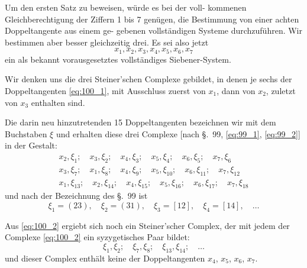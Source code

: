 \documentclass[12pt,a4paper]{article}
\theoremstyle{plain}
\theoremstyle{definition}
\theoremstyle{remark}
\begin{document}
Um den ersten Satz zu beweisen, würde es bei der voll-
kommenen Gleichberechtigung der Ziffern 1 bis 7 genügen, die
Bestimmung von einer achten Doppeltangente aus einem ge-
gebenen vollständigen Systeme durchzuführen. Wir bestimmen
aber besser gleichzeitig drei. Es sei also jetzt
\begin{equation}\label{eq:100_1}
x_1, x_2, x_3, x_4, x_5, x_6, x_7
\end{equation}
ein als bekannt vorausgesetztes vollständiges Siebener-System.

Wir denken uns die drei Steiner'schen Complexe gebildet, in
denen je sechs der Doppeltangenten \eqref{eq:100_1}, mit Ausschluss zuerst
von $x_1$, dann von $x_2$, zuletzt von $x_3$ enthalten sind.

Die darin neu hinzutretenden 15 Doppeltangenten bezeichnen
wir mit dem Buchstaben $\xi$ und erhalten diese drei Complexe
[nach \S.~99, \eqref{eq:99_1}, \eqref{eq:99_2}] in der Gestalt:
\begin{equation}\label{eq:100_2}
\begin{aligned}
x_2, \xi_1; \quad x_3, \xi_2; \quad x_4, \xi_3; \quad x_5, \xi_4; \quad x_6, \xi_5; \quad x_7, \xi_6 \\
x_3, \xi_7; \quad x_1, \xi_8; \quad x_4, \xi_9; \quad x_5, \xi_{10}; \quad x_6, \xi_{11}; \quad x_7, \xi_{12} \\
x_1, \xi_{13}; \quad x_2, \xi_{14}; \quad x_4, \xi_{15}; \quad x_5, \xi_{16}; \quad x_6, \xi_{17}; \quad x_7, \xi_{18}
\end{aligned}
\end{equation}
und nach der Bezeichnung des \S.~99 ist
\begin{equation*}
\xi_1 = (23), \quad \xi_2 = (31), \quad \xi_3 = [12], \quad \xi_4 = [14], \quad \ldots
\end{equation*}

Aus \eqref{eq:100_2} ergiebt sich noch ein Steiner'scher Complex, der
mit jedem der Complexe \eqref{eq:100_2} ein syzygetisches Paar bildet:
\begin{equation}\label{eq:100_3}
\xi_1, \xi_2; \quad \xi_7, \xi_8; \quad \xi_{13}, \xi_{14}; \quad \ldots
\end{equation}
und dieser Complex enthält keine der Doppeltangenten $x_4$, $x_5$, $x_6$, $x_7$.
\end{document}
